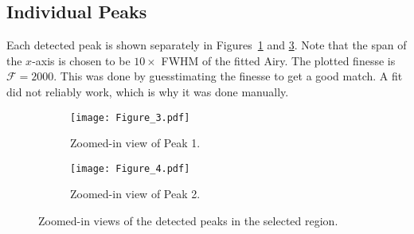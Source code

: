 \subsection{Individual Peaks}
Each detected peak is shown separately in Figures~\ref{fig:peak1} and \ref{fig:peak2}.
Note that the span of the $x$-axis is chosen to be $10 \times$ FWHM of the fitted Airy.
The plotted finesse is $\mathcal{F}=2000$. This was done by guesstimating the finesse to get a good match.
A fit did not reliably work, which is why it was done manually.

\begin{figure}[H]
    \centering
    \begin{subfigure}[t]{0.48\textwidth}
        \centering
        \texttt{[image: Figure\_3.pdf]}
        \caption{Zoomed-in view of Peak 1.}
        \label{fig:peak1}
    \end{subfigure}
    \hfill
    \begin{subfigure}[t]{0.48\textwidth}
        \centering
        \texttt{[image: Figure\_4.pdf]}
        \caption{Zoomed-in view of Peak 2.}
        \label{fig:peak2}
    \end{subfigure}
    \caption{Zoomed-in views of the detected peaks in the selected region.}
\end{figure}
